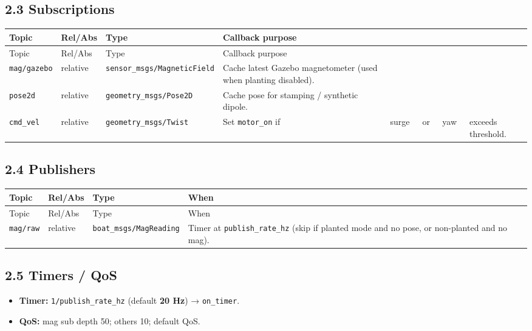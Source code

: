 \subsection{2.3 Subscriptions}


\begin{center}
\small
\begin{longtable}{@{}p{2.1cm}p{2.1cm}p{2.1cm}p{2.1cm}p{2.1cm}p{2.1cm}p{2.1cm}p{3.2cm}@{}}
\toprule
Topic & Rel/Abs & Type & Callback purpose &  &  &  &  \\
\midrule
\endfirsthead
\toprule
Topic & Rel/Abs & Type & Callback purpose &  &  &  &  \\
\midrule
\endhead
\texttt{mag/gazebo} & relative & \texttt{sensor\_msgs/MagneticField} & Cache latest Gazebo magnetometer (used when planting disabled). &  &  &  &  \\
\texttt{pose2d} & relative & \texttt{geometry\_msgs/Pose2D} & Cache pose for stamping / synthetic dipole. &  &  &  &  \\
\texttt{cmd\_vel} & relative & \texttt{geometry\_msgs/Twist} & Set \texttt{motor\_on} if \ & surge\ & or \ & yaw\ & exceeds threshold. \\
\bottomrule
\end{longtable}
\end{center}


\subsection{2.4 Publishers}


\begin{center}
\small
\begin{longtable}{@{}lllp{5.2cm}@{}}
\toprule
Topic & Rel/Abs & Type & When \\
\midrule
\endfirsthead
\toprule
Topic & Rel/Abs & Type & When \\
\midrule
\endhead
\texttt{mag/raw} & relative & \texttt{boat\_msgs/MagReading} & Timer at \texttt{publish\_rate\_hz} (skip if planted mode and no pose, or non-planted and no mag). \\
\bottomrule
\end{longtable}
\end{center}


\subsection{2.5 Timers / QoS}


\begin{itemize}[leftmargin=*]
\item \textbf{Timer:} \texttt{1/publish\_rate\_hz} (default \textbf{20 Hz}) → \texttt{on\_timer}.
\item \textbf{QoS:} mag sub depth 50; others 10; default QoS.
\end{itemize}


